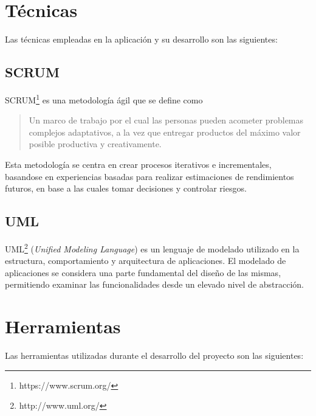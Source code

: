 
\section{Técnicas}
Las técnicas empleadas en la aplicación y su desarrollo son las siguientes:

\subsection{SCRUM}
SCRUM\footnote{https://www.scrum.org/} es una metodología ágil que se define como
\begin{quote}
Un marco de trabajo por el cual las personas pueden acometer problemas complejos 
adaptativos, a la vez que entregar productos del máximo valor posible productiva y 
creativamente\cite{scrum}.
\end{quote}
Esta metodología se centra en crear procesos iterativos e incrementales, basandose en experiencias basadas para realizar estimaciones de rendimientos futuros, en base a las cuales tomar decisiones y controlar riesgos.

\subsection{UML}
UML\footnote{http://www.uml.org/} (\emph{Unified Modeling Language}) es un lenguaje de modelado utilizado en la estructura, comportamiento y arquitectura de aplicaciones.
El modelado de aplicaciones se considera una parte fundamental del diseño de las mismas, permitiendo examinar las funcionalidades desde un elevado nivel de abstracción.

\section{Herramientas}
Las herramientas utilizadas durante el desarrollo del proyecto son las siguientes:

